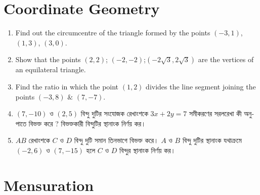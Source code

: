 \documentclass[11pt, a4paper]{article}
\begin{document}
\section{Coordinate Geometry}

\begin{enumerate}


	\item Find out the circumcentre of the triangle formed by the points $(-3,1)$, $(1,3)$, $(3,0)$.
	
	\item Show that the points $ (2,2) $; $(-2,-2)$;$(-2\sqrt{3},2\sqrt{3})$ are the vertices of an equilateral triangle.
	
	\item Find the ratio in which the point $(1,2)$ divides the line segment joining the points $(-3,8)$ $\&$ $(7,-7)$.
	
	\item $(7, -10)$ \textbengali{ও} $(2, 5)$  \textbengali{বিন্দু দুটির সংযোজক রেখাংশকে}  $3x + 2y = 7$ \textbengali{সমীকরণের সরলরেখা কী অনুপাতে বিভক্ত করে ? বিভক্তকারী বিন্দুটির স্থানাংক নির্ণয় কর।}
	
	\item $AB$ \textbengali{রেখাংশকে} $C$ \textbengali{ও} $D$ \textbengali{বিন্দু দুটি সমান তিনভাগে বিভক্ত করে।} $A$ \textbengali{ও} $B$ \textbengali{বিন্দু দুটির স্থানাংক যথাক্রমে} $(-2, 6)$ \textbengali{ও} $(7, -15)$ \textbengali{হলে} $C$ \textbengali{ও} $D$ \textbengali{বিন্দুর স্থানাংক নির্ণয় কর।}

\end{enumerate}



\section{Mensuration}
\end{document}
